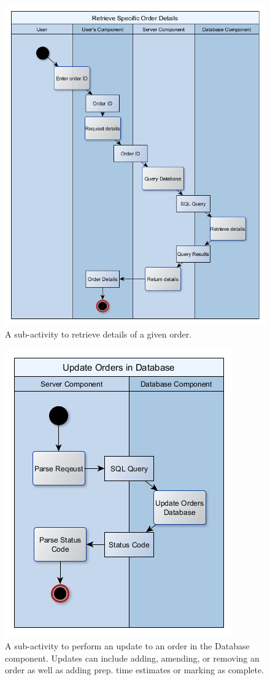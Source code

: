 \documentclass[11pt, a4paper]{report}
\begin{document}
\begin{figure}[H]
\centering
\includegraphics[scale=0.75]{Figures/RetrieveOrder.png}
\caption{A sub-activity to retrieve details of a given order.}
\end{figure}

\begin{figure}[H]
\centering
\includegraphics[scale=1]{Figures/UpdateOrderDB.png}
\caption{A sub-activity to perform an update to an order in the Database component.\newline
Updates can include adding, amending, or removing an order as well as adding prep. time estimates or marking as complete.}
\end{figure}
\end{document}

